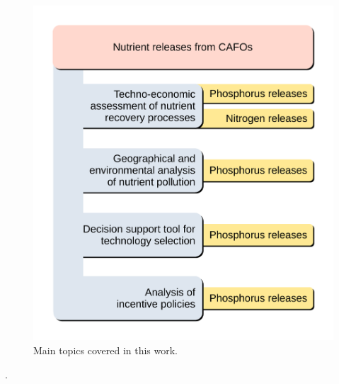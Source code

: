 \begin{refsection}[referencesCh1]
\begin{figure}[h]
	\centering
	\includegraphics[width=0.7\linewidth, trim={1cm 1cm 1cm 1cm},clip]{gfx/Chapter1/IntroFig2_1.pdf} 
	\caption{Main topics covered in this work.}
	\label{fig:Ch1WorkThesis}
\end{figure}. 



\end{refsection}
